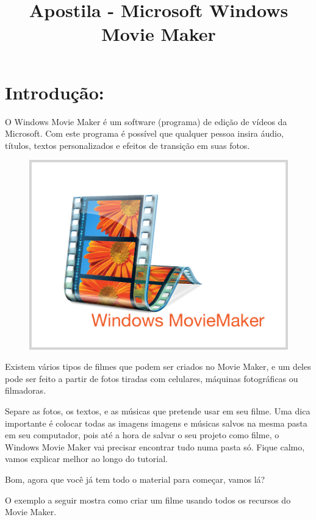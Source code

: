 \documentclass{article}
\title{Apostila - Microsoft Windows Movie Maker}
\author{}
\date{}
\begin{document}
\maketitle

{\large

\section{Introdução:}
O Windows Movie Maker é um software (programa) de edição de vídeos da Microsoft.
Com este programa é possível que qualquer pessoa insira áudio, títulos, textos personalizados e efeitos de transição em suas fotos.

\begin{figure}[h!]
\centering
\includegraphics[scale=0.5]{movie-maker.png}
\end{figure} 

Existem vários tipos de filmes que podem ser criados no Movie Maker, e um deles pode ser feito a partir de fotos tiradas com celulares, máquinas fotográficas ou filmadoras.

Separe as fotos, os textos, e as músicas que pretende usar em seu filme. Uma dica importante é colocar todas as imagens imagens e músicas salvos na mesma pasta em seu computador, pois até a hora de salvar o seu projeto como filme, o Windows Movie Maker vai precisar encontrar tudo numa pasta só. Fique calmo, vamos explicar melhor ao longo do tutorial. \newline

Bom, agora que você já tem todo o material para começar, vamos lá? \newline

O exemplo a seguir mostra como criar um filme usando todos os recursos do
Movie Maker. \newline

}
\end{document}
